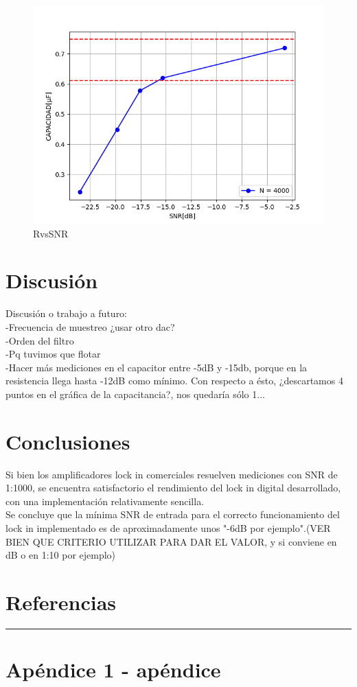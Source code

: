 \documentclass[11pt,a4paper]{extarticle}
\begin{document}
\begin{multicols}{2}
\begin{figure}[H]
	\centering
	\includegraphics[width=\linewidth]{Images/CvsSNR(segunda).png}
	\caption{RvsSNR}
	\label{fig:CvsSNR}
\end{figure}


\section{Discusión}
Discusión o trabajo a futuro:\\
-Frecuencia de muestreo ¿usar otro dac?\\
-Orden del filtro\\
-Pq tuvimos que flotar\\
-Hacer más mediciones en el capacitor entre -5dB y -15db, 
porque en la resistencia llega hasta -12dB como mínimo.
Con respecto a ésto, ¿descartamos 4 puntos en el gráfica de 
la capacitancia?, nos quedaría sólo 1...

\section{Conclusiones}

Si bien los amplificadores lock in comerciales resuelven 
mediciones con SNR de 1:1000, se encuentra satisfactorio 
el rendimiento del lock in digital desarrollado, con 
una implementación relativamente sencilla.\\

Se concluye que la mínima SNR de entrada para el 
correcto funcionamiento del lock in implementado es de 
aproximadamente unos "-6dB por ejemplo".(VER BIEN QUE 
CRITERIO UTILIZAR PARA DAR EL VALOR, y si 
conviene en dB o en 1:10 por ejemplo)

\section{Referencias}




\end{multicols}
\newpage
\begin{appendices}
\vspace{-1em}
\hrule
\vspace{1em}
\normalsize
\section{Apéndice 1 - apéndice}
\end{appendices}
\end{document}
